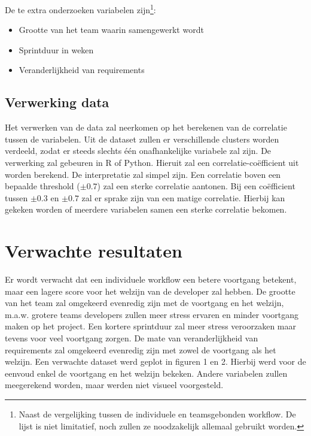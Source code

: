De te extra onderzoeken variabelen zijn\footnote{Naast de vergelijking tussen de individuele en teamsgebonden workflow. De lijst is niet limitatief, noch zullen ze noodzakelijk allemaal gebruikt worden.}:
\begin{itemize}
\item Grootte van het team waarin samengewerkt wordt
\item Sprintduur in weken
\item Veranderlijkheid van requirements
\end{itemize}

\subsection{Verwerking data}
Het verwerken van de data zal neerkomen op het berekenen van de correlatie tussen de variabelen. Uit de dataset zullen er verschillende clusters worden verdeeld, zodat er steeds slechts één onafhankelijke variabele zal zijn. 
De verwerking zal gebeuren in R of Python. Hieruit zal een correlatie-coëfficient uit worden berekend. De interpretatie zal simpel zijn. Een correlatie boven een bepaalde threshold ($\pm 0.7$) zal een sterke correlatie aantonen. Bij een coëfficient tussen $\pm 0.3$ en $\pm 0.7$ zal er sprake zijn van een matige correlatie. Hierbij kan gekeken worden of meerdere variabelen samen een sterke correlatie bekomen.

\section{Verwachte resultaten}
\label{sec:verwachte_resultaten}


Er wordt verwacht dat een individuele workflow een betere voortgang betekent, maar een lagere score voor het welzijn van de developer zal hebben. De grootte van het team zal omgekeerd evenredig zijn met de voortgang en het welzijn, m.a.w. grotere teams developers zullen meer stress ervaren en minder voortgang maken op het project. Een kortere sprintduur zal meer stress veroorzaken maar tevens voor veel voortgang zorgen. De mate van veranderlijkheid van requirements zal omgekeerd evenredig zijn met zowel de voortgang als het welzijn. Een verwachte dataset werd geplot in figuren 1 en 2. Hierbij werd voor de eenvoud enkel de voortgang en het welzijn bekeken. Andere variabelen zullen meegerekend worden, maar werden niet visueel voorgesteld.

